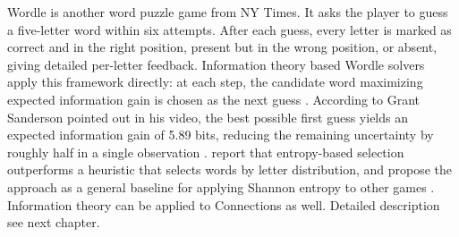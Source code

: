 Wordle is another word puzzle game from NY Times. It asks the player to guess a five-letter word within six attempts. After each guess, every letter is marked as correct and in the right position, present but in the wrong position, or absent, giving detailed per-letter feedback. Information theory based Wordle solvers apply this framework directly: at each step, the candidate word maximizing expected information gain is chosen as the next guess \cite{aladailehSolvingWordleUsing2026}. According to Grant Sanderson pointed out in his video, the best possible first guess yields an expected information gain of 5.89 bits, reducing the remaining uncertainty by roughly half in a single observation \cite{3blue1brownSolvingWordleUsing2022}. \citeauthor{aladailehSolvingWordleUsing2026} report that entropy-based selection outperforms a heuristic that selects words by letter distribution, and propose the approach as a general baseline for applying Shannon entropy to other games \cite{aladailehSolvingWordleUsing2026}.
Information theory can be applied to Connections as well. Detailed description see next chapter.


